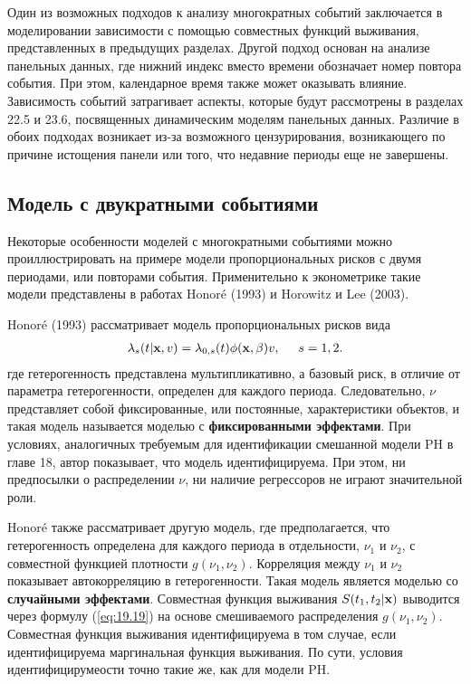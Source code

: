 Один из возможных подходов к анализу многократных событий заключается в моделировании зависимости с помощью совместных функций выживания, представленных в предыдущих разделах. Другой подход основан на анализе панельных данных, где нижний индекс вместо времени обозначает номер повтора события. При этом, календарное время также может оказывать влияние. Зависимость событий затрагивает аспекты, которые будут рассмотрены в разделах 22.5 %
и 23.6, %
посвященных динамическим моделям панельных данных. Различие в обоих подходах возникает из-за возможного цензурирования, возникающего по причине истощения панели или того, что недавние периоды еще не завершены.




\subsection{Модель с двукратными событиями}\label{sec:19.4.1}

\noindent
Некоторые особенности моделей с многократными событиями можно проиллюстрировать на примере модели пропорциональных рисков с двумя периодами, или повторами события. Применительно к эконометрике такие модели представлены в работах Honor\'e (1993) и Horowitz и Lee (2003).

Honor\'e (1993) рассматривает модель пропорциональных рисков вида
        \begin{align}\label{eq:19.24}
        \lambda_s(t|\mathbf{x},v) = \lambda_{0,s}(t) \phi(\mathbf{x},\beta)v, \hspace{0.5cm} s=1,2.
        \end{align}
где гетерогенность представлена мультипликативно, а базовый риск, в отличие от параметра гетерогенности, определен для каждого периода. Следовательно, $\nu$ представляет собой фиксированные, или постоянные, характеристики объектов, и такая модель называется моделью с \textbf{фиксированными эффектами}. При условиях, аналогичных требуемым для идентификации смешанной модели PH в главе 18, автор показывает, что модель идентифицируема. При этом, ни предпосылки о распределении $\nu$, ни наличие регрессоров не играют значительной роли.

Honor\'e также рассматривает другую модель, где предполагается, что гетерогенность определена для каждого периода в отдельности, $\nu_1$ и $\nu_2$, с совместной функцией плотности $g(\nu_1, \nu_2)$. Корреляция между $\nu_1$ и $\nu_2$ показывает автокорреляцию в гетерогенности. Такая модель является моделью со \textbf{случайными эффектами}. Совместная функция выживания $S(t_1, t_2|\mathbf{x})$ выводится через формулу  (\ref{eq:19.19}) на основе смешиваемого распределения $g(\nu_1, \nu_2)$. Совместная функция выживания идентифицируема в том случае, если идентифицируема маргинальная функция выживания. По сути, условия идентифицирумеости точно такие же, как для модели PH.

